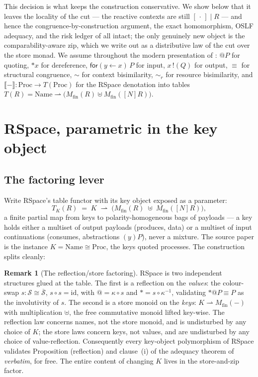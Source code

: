 \documentclass[11pt]{article}
\makeatletter
\theoremstyle{plain}
\theoremstyle{definition}
\newtheorem{remark}{Remark}
\newcommand{\den}[1]{\llbracket #1 \rrbracket}
\newcommand{\Name}{\mathrm{Name}}
\newcommand{\Proc}{\mathrm{Proc}}
\newcommand{\Mfin}{M_{\mathrm{fin}}}
\newcommand{\rfor}[2]{\mathsf{for}(#1\!\leftarrow\!#2)\,}
\newcommand{\rout}[2]{#1\,!(#2)}
\newcommand{\quo}{@}
\newcommand{\der}{{\ast}}
\newcommand{\rr}{\rightharpoonup}
\newcommand{\bisr}{\sim_{r}}
\newcommand{\bis}{\sim}
\makeatother
\begin{document}
This decision is what keeps the construction conservative. We show below that it leaves the locality
of the cut --- the reactive contexts are still $[\,\cdot\,]\mid R$ --- and hence the
congruence-by-construction argument, the exact homomorphism, OSLF adequacy, and the risk ledger of
\cite{KnotRho} all intact; the only genuinely new object is the comparability-aware zip, which we
write out as a distributive law of the cut over the store monad. We assume throughout the modern
presentation of \cite{KnotRho}: $\quo P$ for quoting, $\der x$ for dereference, $\rfor{y}{x}P$ for
input, $\rout{x}{Q}$ for output, $\equiv$ for structural congruence, $\bis$ for context bisimilarity,
$\bisr$ for resource bisimilarity, and $\den{-}\colon\Proc\to T(\Proc)$ for the RSpace denotation
into tables $T(R)=\Name\rr\bigl(\Mfin(R)\uplus\Mfin([N]R)\bigr)$.

\section{RSpace, parametric in the key object}\label{sec:param}

\subsection{The factoring lever}

Write RSpace's table functor with its key object exposed as a parameter:
\[
  T_{K}(R)\;=\;K\;\rr\;\bigl(\Mfin(R)\;\uplus\;\Mfin([N]R)\bigr),
\]
a finite partial map from keys to polarity-homogeneous bags of payloads --- a key holds either a
multiset of output payloads (produces, data) or a multiset of input continuations (consumes,
abstractions $(y)P$), never a mixture. The source paper is the instance $K=\Name\cong\Proc$, the
keys quoted processes. The construction splits cleanly:

\begin{remark}[The reflection/store factoring]\label{rem:factor}
RSpace is two independent structures glued at the table. The first is a reflection on the
\emph{values}: the colour-swap $s\colon\mathcal S\cong\overline{\mathcal S}$, $s\circ s=\mathrm{id}$,
with $\quo=\kappa\circ s$ and $\der=s\circ\kappa^{-1}$, validating $\der\quo P\equiv P$ as the
involutivity of $s$. The second is a store monoid on the \emph{keys}: $K\rr\Mfin(-)$ with
multiplication $\uplus$, the free commutative monoid lifted key-wise. The reflection law concerns
names, not the store monoid, and is undisturbed by any choice of $K$; the store laws concern keys,
not values, and are undisturbed by any choice of value-reflection. Consequently every key-object
polymorphism of RSpace validates Proposition (reflection) and clause~(i) of the adequacy theorem of
\cite{KnotRho} \emph{verbatim}, for free. The entire content of changing $K$ lives in the
store-and-zip factor.
\end{remark}
\end{document}

